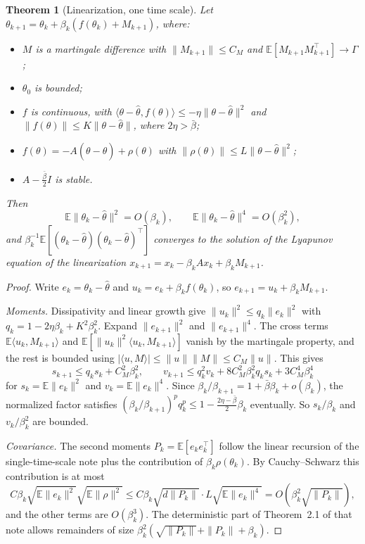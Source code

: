 \documentclass[11pt]{article}
\newtheorem{theorem}{Theorem}[section]
\theoremstyle{definition}
\theoremstyle{remark}
\newcommand{\E}{\mathbb{E}}
\begin{document}
\begin{theorem}[Linearization, one time scale]\label{thm:linearize}
Let $\theta_{k+1} = \theta_k + \beta_k(f(\theta_k) + M_{k+1})$, where:
\begin{itemize}
\item $M$ is a martingale difference with $\|M_{k+1}\| \le C_M$ and $\E[M_{k+1}M_{k+1}^\top] \to \Gamma$;
\item $\theta_0$ is bounded;
\item $f$ is continuous, with
  $\langle\theta - \hat\theta, f(\theta)\rangle \le -\eta\|\theta - \hat\theta\|^2$ and
  $\|f(\theta)\| \le K\|\theta - \hat\theta\|$, where $2\eta > \bar\beta$;
\item $f(\theta) = -A(\theta - \hat\theta) + \rho(\theta)$ with $\|\rho(\theta)\| \le L\|\theta - \hat\theta\|^2$;
\item $A - \frac{\bar\beta}{2}I$ is stable.
\end{itemize}
Then
\[
  \E\|\theta_k - \hat\theta\|^2 = O(\beta_k),\qquad \E\|\theta_k - \hat\theta\|^4 = O(\beta_k^2),
\]
and $\beta_k^{-1}\E[(\theta_k - \hat\theta)(\theta_k - \hat\theta)^\top]$ converges to the solution of the Lyapunov equation of
the linearization $x_{k+1} = x_k - \beta_kAx_k + \beta_kM_{k+1}$.
\end{theorem}
\begin{proof}
Write $e_k = \theta_k - \hat\theta$ and $u_k = e_k + \beta_kf(\theta_k)$, so $e_{k+1} = u_k + \beta_kM_{k+1}$.

\emph{Moments.} Dissipativity and linear growth give
$\|u_k\|^2 \le q_k\|e_k\|^2$ with $q_k = 1 - 2\eta\beta_k + K^2\beta_k^2$. Expand $\|e_{k+1}\|^2$ and $\|e_{k+1}\|^4$. The cross
terms $\E\langle u_k, M_{k+1}\rangle$ and $\E[\|u_k\|^2\langle u_k, M_{k+1}\rangle]$ vanish by the martingale property, and
the rest is bounded using $|\langle u, M\rangle| \le \|u\|\|M\| \le C_M\|u\|$. This gives
\[
  s_{k+1} \le q_ks_k + C_M^2\beta_k^2,\qquad
  v_{k+1} \le q_k^2v_k + 8C_M^2\beta_k^2q_ks_k + 3C_M^4\beta_k^4
\]
for $s_k = \E\|e_k\|^2$ and $v_k = \E\|e_k\|^4$. Since $\beta_k/\beta_{k+1} = 1 + \bar\beta\beta_k + o(\beta_k)$, the normalized
factor satisfies $(\beta_k/\beta_{k+1})^pq_k^p \le 1 - \frac{2\eta - \bar\beta}{2}\beta_k$ eventually. So
$s_k/\beta_k$ and $v_k/\beta_k^2$ are bounded.

\emph{Covariance.} The second moments $P_k = \E[e_ke_k^\top]$ follow the linear recursion of the single-time-scale
note plus the contribution of $\beta_k\rho(\theta_k)$. By Cauchy--Schwarz this contribution is at most
\[
  C\beta_k\sqrt{\E\|e_k\|^2}\sqrt{\E\|\rho\|^2} \le C\beta_k\sqrt{d\|P_k\|}\cdot L\sqrt{\E\|e_k\|^4}
  = O(\beta_k^2\sqrt{\|P_k\|}),
\]
and the other terms are $O(\beta_k^3)$. The deterministic part of Theorem~2.1 of that note allows remainders of
size $\beta_k^2(\sqrt{\|P_k\|} + \|P_k\| + \beta_k)$.
\end{proof}
\end{document}
